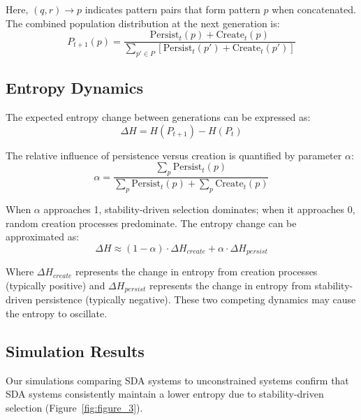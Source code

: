 \documentclass[preprint,12pt]{elsarticle}
\begin{document}
Here, \((q,r) \to p\) indicates pattern pairs that form pattern \(p\) when concatenated. The combined population distribution at the next generation is:
\begin{equation}
\label{eq:full-ba-update}
P_{t+1}(p) = \frac{
  \mathrm{Persist}_t(p) + \mathrm{Create}_t(p)
}{
  \sum_{p' \in P} 
  \left[
    \mathrm{Persist}_t(p') + \mathrm{Create}_t(p')
  \right]
}
\end{equation}

\subsection{Entropy Dynamics}

The expected entropy change between generations can be expressed as:
\begin{equation}
\Delta H = H(P_{t+1}) - H(P_t)
\end{equation}

The relative influence of persistence versus creation is quantified by parameter $\alpha$:
\begin{equation}
\alpha = \frac{\sum_p \mathrm{Persist}_t(p)}{\sum_p \mathrm{Persist}_t(p) + \sum_p \mathrm{Create}_t(p)}
\end{equation}

When $\alpha$ approaches 1, stability-driven selection dominates; when it approaches 0, random creation processes predominate. The entropy change can be approximated as:
\begin{equation}
\Delta H \approx (1 - \alpha) \cdot \Delta H_{create} + \alpha \cdot \Delta H_{persist}
\end{equation}

Where $\Delta H_{create}$ represents the change in entropy from creation processes (typically positive) and $\Delta H_{persist}$ represents the change in entropy from stability-driven persistence (typically negative). These two competing dynamics may cause the entropy to oscillate.

\subsection{Simulation Results}

Our simulations comparing SDA systems to unconstrained systems confirm that SDA systems consistently maintain a lower entropy due to stability-driven selection (Figure~\ref{fig:figure_3}).
\end{document}
